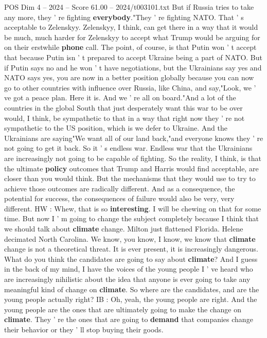 \begin{textsample}{POS Dim 4 – 2024 – Score 61.00 – 2024/t003101.txt}
But if Russia tries to take any more, they ' re fighting \textbf{everybody}."They ' re fighting NATO.
That ' s acceptable to Zelenskyy.
Zelenskyy, I think, can get there in a way that it would be much, much harder for Zelenskyy to accept what Trump would be arguing for on their erstwhile \textbf{phone} call.
The point, of course, is that Putin won ' t accept that because Putin isn ' t prepared to accept Ukraine being a part of NATO.
But if Putin says no and he won ' t have negotiations, but the Ukrainians say yes and NATO says yes, you are now in a better position globally because you can now go to other countries with influence over Russia, like China, and say,"Look, we ' ve got a peace plan.
Here it is.
And we ' re all on board."And a lot of the countries in the global South that just desperately want this war to be over would, I think, be sympathetic to that in a way that right now they ' re not sympathetic to the US position, which is we defer to Ukraine.
And the Ukrainians are saying"We want all of our land back,"and everyone knows they ' re not going to get it back.
So it ' s endless war.
Endless war that the Ukrainians are increasingly not going to be capable of fighting.
So the reality, I think, is that the ultimate \textbf{policy} outcomes that Trump and Harris would find acceptable, are closer than you would think.
But the mechanisms that they would use to try to achieve those outcomes are radically different.
And as a consequence, the potential for success, the consequences of failure would also be very, very different.
HW : Whew, that is so \textbf{interesting}.
I will be chewing on that for some time.
But now I ' m going to change the subject completely because I think that we should talk about \textbf{climate} change.
Milton just flattened Florida.
Helene decimated North Carolina.
We know, you know, I know, we know that \textbf{climate} change is not a theoretical threat.
It is ever present, it is increasingly dangerous.
What do you think the candidates are going to say about \textbf{climate}?
And I guess in the back of my mind, I have the voices of the young people I ' ve heard who are increasingly nihilistic about the idea that anyone is ever going to take any meaningful kind of change on \textbf{climate}.
So where are the candidates, and are the young people actually right?
IB : Oh, yeah, the young people are right.
And the young people are the ones that are ultimately going to make the change on \textbf{climate}.
They ' re the ones that are going to \textbf{demand} that companies change their behavior or they ' ll stop buying their goods.

\end{textsample}
